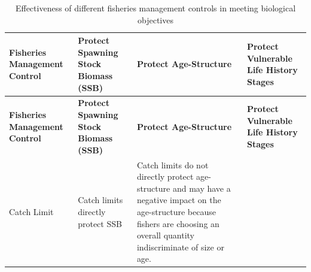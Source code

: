 \documentclass[]{book}
\begin{document}
\begin{longtable}[]{@{}llll@{}}
\caption{\label{tab:fmcs-bio} Effectiveness of different fisheries
management controls in meeting biological objectives}\tabularnewline
\toprule
\begin{minipage}[b]{0.22\columnwidth}\raggedright\strut
\textbf{Fisheries Management Control}\strut
\end{minipage} & \begin{minipage}[b]{0.22\columnwidth}\raggedright\strut
\textbf{Protect Spawning Stock Biomass (SSB)}\strut
\end{minipage} & \begin{minipage}[b]{0.22\columnwidth}\raggedright\strut
\textbf{Protect Age-Structure}\strut
\end{minipage} & \begin{minipage}[b]{0.22\columnwidth}\raggedright\strut
\textbf{Protect Vulnerable Life History Stages}\strut
\end{minipage}\tabularnewline
\midrule
\endfirsthead
\toprule
\begin{minipage}[b]{0.22\columnwidth}\raggedright\strut
\textbf{Fisheries Management Control}\strut
\end{minipage} & \begin{minipage}[b]{0.22\columnwidth}\raggedright\strut
\textbf{Protect Spawning Stock Biomass (SSB)}\strut
\end{minipage} & \begin{minipage}[b]{0.22\columnwidth}\raggedright\strut
\textbf{Protect Age-Structure}\strut
\end{minipage} & \begin{minipage}[b]{0.22\columnwidth}\raggedright\strut
\textbf{Protect Vulnerable Life History Stages}\strut
\end{minipage}\tabularnewline
\midrule
\endhead
\begin{minipage}[t]{0.22\columnwidth}\raggedright\strut
Catch Limit\strut
\end{minipage} & \begin{minipage}[t]{0.22\columnwidth}\raggedright\strut
Catch limits directly protect SSB\strut
\end{minipage} & \begin{minipage}[t]{0.22\columnwidth}\raggedright\strut
Catch limits do not directly protect age-structure and may have a
negative impact on the age-structure because fishers are choosing an
overall quantity indiscriminate of size or age.\strut
\end{minipage} & \begin{minipage}[t]{0.22\columnwidth}\raggedright\strut

\end{minipage}
\end{longtable}
\end{document}

